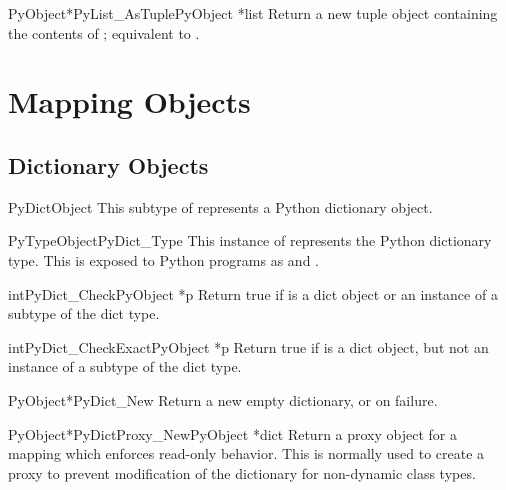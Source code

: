 \begin{cfuncdesc}{PyObject*}{PyList_AsTuple}{PyObject *list}
  Return a new tuple object containing the contents of ;
  equivalent to .
\end{cfuncdesc}


\section{Mapping Objects \label{mapObjects}}



\subsection{Dictionary Objects \label{dictObjects}}

\begin{ctypedesc}{PyDictObject}
  This subtype of  represents a Python dictionary
  object.
\end{ctypedesc}

\begin{cvardesc}{PyTypeObject}{PyDict_Type}
  This instance of  represents the Python
  dictionary type.  This is exposed to Python programs as
   and .
\end{cvardesc}

\begin{cfuncdesc}{int}{PyDict_Check}{PyObject *p}
  Return true if  is a dict object or an instance of a
  subtype of the dict type.
\end{cfuncdesc}

\begin{cfuncdesc}{int}{PyDict_CheckExact}{PyObject *p}
  Return true if  is a dict object, but not an instance of a
  subtype of the dict type.
\end{cfuncdesc}

\begin{cfuncdesc}{PyObject*}{PyDict_New}{}
  Return a new empty dictionary, or \NULL{} on failure.
\end{cfuncdesc}

\begin{cfuncdesc}{PyObject*}{PyDictProxy_New}{PyObject *dict}
  Return a proxy object for a mapping which enforces read-only
  behavior.  This is normally used to create a proxy to prevent
  modification of the dictionary for non-dynamic class types.
\end{cfuncdesc}

